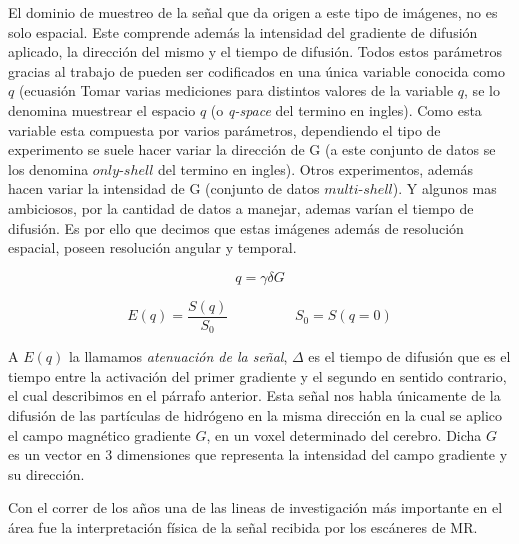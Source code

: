 El dominio de muestreo de la señal que da origen a este tipo de imágenes, no es solo 
espacial. Este comprende además la intensidad del gradiente de difusión aplicado, la dirección del mismo y el 
tiempo de difusión. Todos estos parámetros gracias al trabajo de \citet{CALLAGHAN1990177} pueden ser codificados en una única variable 
conocida como $q$ (ecuasión  Tomar varias mediciones para distintos valores de la variable $q$, se lo denomina 
muestrear el espacio $q$ (o \textit{q-space} del termino en ingles). Como esta variable esta compuesta por varios parámetros, dependiendo el tipo de experimento se 
suele hacer variar la dirección de G (a este conjunto de datos se los denomina $only$-$shell$ del termino en ingles). Otros experimentos,
además hacen variar la intensidad de G (conjunto de datos $multi$-$shell$). Y algunos mas ambiciosos, por la cantidad de datos a manejar, 
ademas varían el tiempo de difusión. Es por ello que decimos que estas imágenes además de resolución espacial, poseen resolución angular y temporal.


\begin{equation} 
\label{eq:3}
 q = \gamma \delta G
\end{equation}

\begin{equation} 
\label{eq:2}
E(q) = \frac{S(q)}{S_0} \hspace{2cm} S_0=S(q=0)
\end{equation}


A $E(q)$ la llamamos \textit{atenuaci\'on de la señal},  
$\Delta$ es el tiempo de difusión que es el tiempo entre la activación del primer gradiente y el segundo en 
sentido contrario, el cual describimos en el párrafo anterior. Esta señal nos 
habla \'unicamente de la difusi\'on de las part\'iculas de hidr\'ogeno en la misma 
direcci\'on en la cual se aplico el campo magn\'etico gradiente $G$, en un voxel determinado del 
cerebro. Dicha $G$ es un vector en 3 dimensiones que representa la intensidad 
del campo gradiente y su direcci\'on.


Con el correr de los años una de las lineas de investigación más 
importante en el \'area fue la interpretaci\'on f\'isica de la se\~nal recibida 
por los escáneres de MR.  




